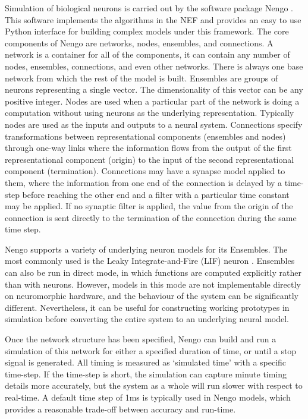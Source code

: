 \documentclass[letterpaper,12pt,titlepage,oneside,final]{book}
\begin{document}
Simulation of biological neurons is carried out by the software package Nengo \cite{bekolay2013nengo}.
This software implements the algorithms in the NEF and provides an easy to use Python interface for building complex models under this framework.
The core components of Nengo are networks, nodes, ensembles, and connections.
A network is a container for all of the components, it can contain any number of nodes, ensembles, connections, and even other networks.
There is always one base network from which the rest of the model is built.
Ensembles are groups of neurons representing a single vector. 
The dimensionality of this vector can be any positive integer.
Nodes are used when a particular part of the network is doing a computation without using neurons as the underlying representation.
Typically nodes are used as the inputs and outputs to a neural system.
Connections specify transformations between representational components (ensembles and nodes) through one-way links where the information flows from the output of the first representational component (origin) to the input of the second representational component (termination).
Connections may have a synapse model applied to them, where the information from one end of the connection is delayed by a time-step before reaching the other end and a filter with a particular time constant may be applied.
If no synaptic filter is applied, the value from the origin of the connection is sent directly to the termination of the connection during the same time step.

Nengo supports a variety of underlying neuron models for its Ensembles.
The most commonly used is the Leaky Integrate-and-Fire (LIF) neuron \cite{burkitt2006review}.
Ensembles can also be run in direct mode, in which functions are computed explicitly rather than with neurons.
However, models in this mode are not implementable directly on neuromorphic hardware, and the behaviour of the system can be significantly different.
Nevertheless, it can be useful for constructing working prototypes in simulation before converting the entire system to an underlying neural model. %

Once the network structure has been specified, Nengo can build and run a simulation of this network for either a specified duration of time, or until a stop signal is generated. 
All timing is measured as `simulated time' with a specific time-step. 
If the time-step is short, the simulation can capture minute timing details more accurately, but the system as a whole will run slower with respect to real-time. A default time step of 1ms is typically used in Nengo models, which provides a reasonable trade-off between accuracy and run-time.
\end{document}
